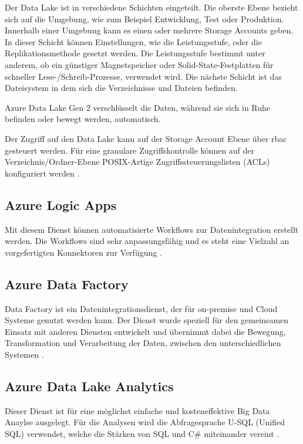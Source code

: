 Der Data Lake ist in verschiedene Schichten eingeteilt. Die oberste Ebene bezieht sich auf die Umgebung, wie zum Beispiel Entwicklung, Test oder Produktion. Innerhalb einer Umgebung kann es einen oder mehrere Storage Accounts geben. In dieser Schicht können Einstellungen, wie die Leistungsstufe, oder die Replikationsmethode gesetzt werden. Die Leistungsstufe bestimmt unter anderem, ob ein günstiger Magnetspeicher oder Solid-State-Festplatten für schneller Lese-/Schreib-Prozesse, verwendet wird. Die nächste Schicht ist das Dateisystem in dem sich die Verzeichnisse und Dateien befinden.

Azure Data Lake Gen 2 verschlüsselt die Daten, während sie sich in Ruhe befinden oder bewegt werden, automatisch.

Der Zugriff auf den Data Lake kann auf der Storage Account Ebene über \ac{rbac} gesteuert werden. Für eine granulare Zugriffskontrolle können auf der Verzeichnis/Ordner-Ebene POSIX-Artige Zugriffssteuerungslisten (ACLs) konfiguriert werden \cite{lesteve_definitive_2021}.




\subsection{Azure Logic Apps} \label{sec:grundlagen:azure_dienste:logicApps}
Mit diesem Dienst können automatisierte Workflows zur Datenintegration erstellt werden. Die Workflows sind sehr anpassungsfähig und es steht eine Vielzahl an vorgefertigten Konnektoren zur Verfügung \cite{kumar_serverless_2019}.

\subsection{Azure Data Factory} \label{sec:grundlagen:azure_dienste:dataFactory}
Data Factory ist ein Datenintegrationsdienst, der für on-premise und Cloud Systeme genutzt werden kann. Der Dienst wurde speziell für den gemeinsamen Einsatz mit anderen Diensten entwickelt und übernimmt dabei die Bewegung, Transformation und Verarbeitung der Daten, zwischen den unterschiedlichen Systemen \cite{klein_iot_2017}.

\subsection{Azure Data Lake Analytics} \label{sec:grundlagen:azure_dienste:dataLakeAnalytics}
Dieser Dienst ist für eine möglichst einfache und kosteneffektive Big Data Anaylse ausgelegt. Für die Analysen wird die Abfragesprache U-SQL (Unified SQL) verwendet, welche die Stärken von SQL und C\# miteinander vereint \cite{klein_iot_2017}. 


